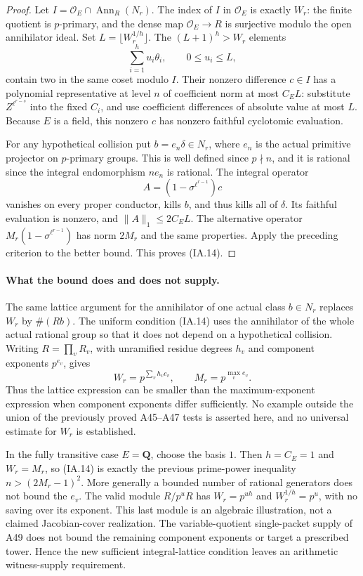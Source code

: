\begin{proof}
Let $I=\mathcal O_E\cap\operatorname{Ann}_R(N_r)$. The index of $I$
in $\mathcal O_E$ is exactly $W_r$: the finite quotient is $p$-primary,
and the dense map $\mathcal O_E\to R$ is surjective modulo the open
annihilator ideal. Set $L=\lfloor W_r^{1/h}\rfloor$.
The $(L+1)^h>W_r$ elements
\[
                 \sum_{i=1}^h u_i\theta_i,\qquad 0\le u_i\le L,
\tag{IA.15}
\]
contain two in the same coset modulo $I$. Their nonzero difference
$c\in I$ has a polynomial representative at level $n$ of coefficient
norm at most $C_E L$: substitute $Z^{\ell^{r-s}}$ into the fixed
$C_i$, and use coefficient differences of absolute value at most $L$.
Because $E$ is a field, this nonzero $c$ has nonzero faithful
cyclotomic evaluation.

For any hypothetical collision put $b=e_n\delta\in N_r$, where
$e_n$ is the actual primitive projector on $p$-primary groups. This
is well defined since $p\nmid n$, and it is rational since the
integral endomorphism $ne_n$ is rational. The integral operator
\[
                  A=(1-\sigma^{\ell^{r-1}})c
\tag{IA.16}
\]
vanishes on every proper conductor, kills $b$, and thus kills all of
$\delta$. Its faithful evaluation is nonzero, and
$\|A\|_1\le2C_E L$. The alternative operator
$M_r(1-\sigma^{\ell^{r-1}})$ has norm $2M_r$ and the same properties.
Apply the preceding criterion to the better bound. This proves
(IA.14).
\end{proof}

\paragraph{What the bound does and does not supply.}
The same lattice argument for the annihilator of one actual class
$b\in N_r$ replaces $W_r$ by $\#(Rb)$. The uniform condition (IA.14)
uses the annihilator of the whole actual rational group so that it
does not depend on a hypothetical collision.
Writing $R=\prod_vR_v$, with unramified residue degrees $h_v$ and
component exponents $p^{e_v}$, gives
\[
                       W_r=p^{\sum_v h_ve_v},\qquad
                       M_r=p^{\max_v e_v}.
\tag{IA.17}
\]
Thus the lattice expression can be smaller than the maximum-exponent
expression when component exponents differ sufficiently. No example
outside the union of the previously proved A45--A47 tests is asserted
here, and no universal estimate for $W_r$ is established.

In the fully transitive case $E=\mathbf Q$, choose the basis $1$.
Then $h=C_E=1$ and $W_r=M_r$, so (IA.14) is exactly the previous
prime-power inequality $n>(2M_r-1)^2$. More generally a bounded
number of rational generators does not bound the $e_v$. The valid
module $R/p^uR$ has $W_r=p^{uh}$ and $W_r^{1/h}=p^u$, with no saving
over its exponent. This last module is an algebraic illustration,
not a claimed Jacobian-cover realization. The variable-quotient
single-packet supply of A49 does not bound the remaining component
exponents or target a prescribed tower. Hence the new sufficient
integral-lattice condition leaves an arithmetic witness-supply
requirement.
